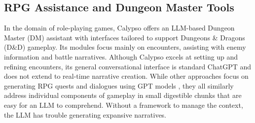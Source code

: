 \subsection{RPG Assistance and Dungeon Master Tools}
In the domain of role-playing games, Calypso \cite{Calypso} offers an LLM-based Dungeon Master (DM) assistant with interfaces tailored to support Dungeons \& Dragons (D\&D) gameplay. Its modules focus mainly on encounters, assisting with enemy information and battle narratives. Although Calypso excels at setting up and refining encounters, its general conversational interface is standard ChatGPT \cite{chatgpt} and does not extend to real-time narrative creation. While other approaches focus on generating RPG quests and dialogues using GPT models \cite{SceneCraft, 1001Nights}, they all similarly address individual components of gameplay in small digestible chunks that are easy for an LLM to comprehend. Without a framework to manage the context, the LLM has trouble generating expansive narratives.

